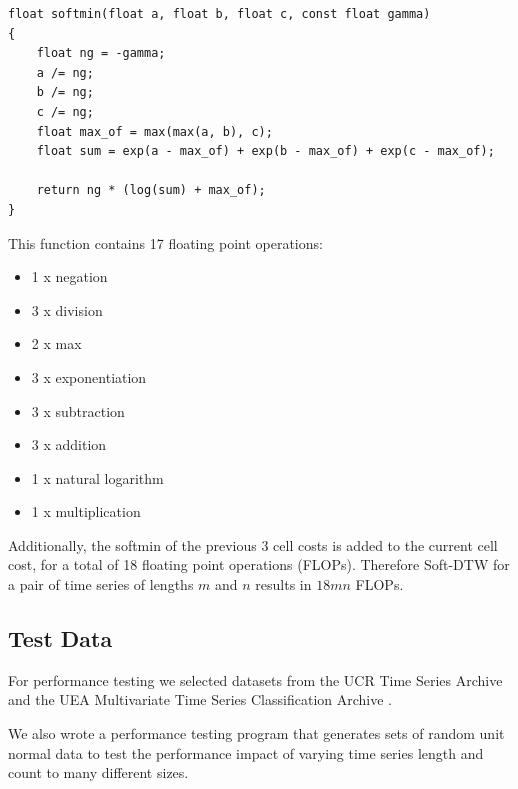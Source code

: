 \documentclass[12pt, letterpaper]{article}
\begin{document}
\begin{verbatim}
float softmin(float a, float b, float c, const float gamma)
{
    float ng = -gamma;
    a /= ng;
    b /= ng;
    c /= ng;
    float max_of = max(max(a, b), c);
    float sum = exp(a - max_of) + exp(b - max_of) + exp(c - max_of);

    return ng * (log(sum) + max_of);
}
\end{verbatim}

This function contains 17 floating point operations:

\begin{itemize}
  \item 1 x negation
  \item 3 x division
  \item 2 x max
  \item 3 x exponentiation
  \item 3 x subtraction
  \item 3 x addition
  \item 1 x natural logarithm
  \item 1 x multiplication
\end{itemize}

Additionally, the softmin of the previous 3 cell costs is added to the current
cell cost, for a total of 18 floating point operations (FLOPs). Therefore
Soft-DTW for a pair of time series of lengths $m$ and $n$ results in $18mn$
FLOPs.

\subsection{Test Data}

For performance testing we selected datasets from the UCR Time Series Archive
\cite{dau_ucr_2019} and the UEA Multivariate Time Series Classification Archive
\cite{bagnall_uea_2018}.

We also wrote a performance testing program that generates sets of random unit
normal data to test the performance impact of varying time series length and
count to many different sizes.
\end{document}
